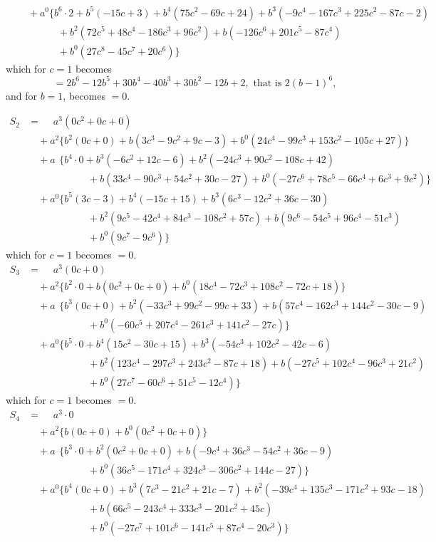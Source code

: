 \documentclass[11pt,a4paper]{article}
\begin{document}
\begin{align*}
&\quad + a^0\{b^6\cdot 2 + b^5(-15c + 3) + b^4(75c^2 - 69c + 24) + b^3(-9c^4 - 167c^3 + 225c^2 - 87c - 2)\\
&\qquad\qquad + b^2(72c^5 + 48c^4 - 186c^3 + 96c^2) + b(-126c^6 + 201c^5 - 87c^4)\\
&\qquad\qquad + b^0(27c^8 - 45c^7 + 20c^6)\}
\end{align*}
which for $c=1$ becomes
\[\qquad = 2b^6 - 12b^5 + 30b^4 - 40b^3 + 30b^2 - 12b + 2,\text{ that is }2(b-1)^6,\]
and for $b=1$, becomes $=0$.

\begin{align*}
S_2 &= \phantom{+}a^3(0c^2 + 0c + 0)\\
  &\quad + a^2\{b^2(0c + 0) + b(3c^3 - 9c^2 + 9c - 3) + b^0(24c^4 - 99c^3 + 153c^2 - 105c + 27)\}\\
  &\quad + a\phantom{^2}\{b^4\cdot 0 + b^3(-6c^2 + 12c - 6) + b^2(-24c^3 + 90c^2 - 108c + 42)\\
  &\qquad\qquad\qquad + b(33c^4 - 90c^3 + 54c^2 + 30c - 27) + b^0(-27c^6 + 78c^5 - 66c^4 + 6c^3 + 9c^2)\}\\
  &\quad + a^0\{b^5(3c - 3) + b^4(-15c + 15) + b^3(6c^3 - 12c^2 + 36c - 30)\\
  &\qquad\qquad\qquad + b^2(9c^5 - 42c^4 + 84c^3 - 108c^2 + 57c) + b(9c^6 - 54c^5 + 96c^4 - 51c^3)\\
  &\qquad\qquad\qquad + b^0(9c^7 - 9c^6)\}
\end{align*}
which for $c=1$ becomes $=0$.
\begin{align*}
S_3 &= \phantom{+}a^3(0c + 0)\\
  &\quad + a^2\{b^2\cdot 0 + b(0c^2 + 0c + 0) + b^0(18c^4 - 72c^3 + 108c^2 - 72c + 18)\}\\
  &\quad + a\phantom{^2}\{b^3(0c + 0) + b^2(-33c^3 + 99c^2 - 99c + 33) + b(57c^4 - 162c^3 + 144c^2 - 30c - 9)\\
  &\qquad\qquad\qquad + b^0(-60c^5 + 207c^4 - 261c^3 + 141c^2 - 27c)\}\\
  &\quad + a^0\{b^5\cdot 0 + b^4(15c^2 - 30c + 15) + b^3(-54c^3 + 102c^2 - 42c - 6)\\
  &\qquad\qquad\qquad + b^2(123c^4 - 297c^3 + 243c^2 - 87c + 18) + b(-27c^5 + 102c^4 - 96c^3 + 21c^2)\\
  &\qquad\qquad\qquad + b^0(27c^7 - 60c^6 + 51c^5 - 12c^4)\}
\end{align*}
which for $c=1$ becomes $=0$.
\begin{align*}
S_4 &= \phantom{+}a^3\cdot 0\\
  &\quad + a^2\{b(0c + 0) + b^0(0c^2 + 0c + 0)\}\\
  &\quad + a\phantom{^2}\{b^3\cdot 0 + b^2(0c^2 + 0c + 0) + b(-9c^4 + 36c^3 - 54c^2 + 36c - 9)\\
  &\qquad\qquad\qquad + b^0(36c^5 - 171c^4 + 324c^3 - 306c^2 + 144c - 27)\}\\
  &\quad + a^0\{b^4(0c + 0) + b^3(7c^3 - 21c^2 + 21c - 7) + b^2(-39c^4 + 135c^3 - 171c^2 + 93c - 18)\\
  &\qquad\qquad\qquad + b(66c^5 - 243c^4 + 333c^3 - 201c^2 + 45c)\\
  &\qquad\qquad\qquad + b^0(-27c^7 + 101c^6 - 141c^5 + 87c^4 - 20c^3)\}
\end{align*}
\end{document}
